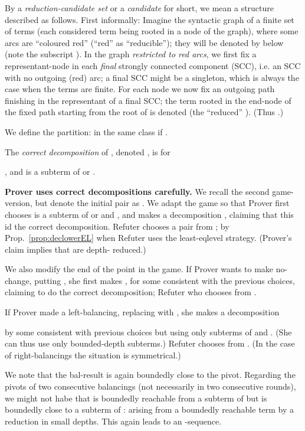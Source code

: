 \documentclass{llncs}
\begin{document}
By a \emph{reduction-candidate set} 
or a \emph{candidate} for short, we mean a structure  
described as follows. First informally: Imagine the syntactic graph
of a finite 
set of terms (each considered term being rooted in a node of the graph), 
where some arcs are ``coloured
red'' (``red'' as ``reducible''); they will be denoted by 
below (note the subscript ).
In the graph \emph{restricted to red arcs},
we first fix a representant-node in each 
 \emph{final} strongly connected
component (SCC), i.e. an SCC with no outgoing (red) arc; a final SCC 
might be a singleton, which is always the case when the terms are
finite.
For each node we now
fix an outgoing path finishing in the representant of
a final SCC;
the term rooted 
in the end-node of the fixed path starting from
the root of  is denoted  (the ``reduced'' ). 
(Thus .)

We define the partition:  in the same class if
.




The \emph{correct decomposition}
of , denoted , is  for 
\begin{center}
, and  is a subterm of  or .
\end{center}

\textbf{Prover uses correct decompositions carefully.}
We recall the second game-version, but denote the initial pair as
. 
We adapt the game so that
Prover first chooses  is a subterm of  or  and , and
makes 
a decomposition ,
claiming that this id the correct decomposition.
Refuter
chooses a pair  from ;
by Prop.~\ref{prop:declowerEL}
 when Refuter uses the least-eqlevel strategy.
(Prover's claim implies that  are depth- reduced.)


We also modify the end of the point  in the game. If Prover wants
to make no-change, putting , she first 
makes , for some  consistent with the previous
choices, claiming to do the correct decomposition;
Refuter who chooses  from 
.

If Prover made a left-balancing, replacing  
 with , 
she makes a decomposition

by some  consistent with previous
choices but using only subterms of  and .
(She can thus use only bounded-depth subterms.)
Refuter chooses  from .
(In the case of right-balancings the situation is symmetrical.)

We note that the bal-result is again boundedly close to the
pivot. Regarding the pivots  of two consecutive balancings 
(not necessarily in two consecutive rounds), we might not habe that
 is boundedly reachable from a subterm of  but  is boundedly
close to a subterm of : arising from a boundedly reachable term by
a reduction in small depths. This again leads to an -sequence.
\end{document}
